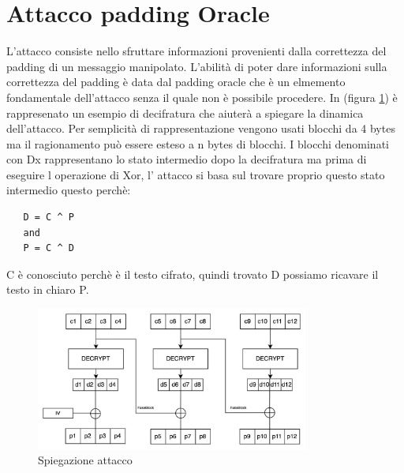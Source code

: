 \section{Attacco padding Oracle}

L'attacco consiste nello sfruttare informazioni provenienti dalla correttezza del padding di un messaggio manipolato.
L'abilità di poter dare informazioni sulla correttezza del padding è data dal padding oracle che è un elmemento 
fondamentale dell'attacco senza il quale non è possibile procedere.
In (figura \ref{fig:attack_1}) è rappresenato un esempio di decifratura che aiuterà a spiegare la dinamica dell'attacco.
Per semplicità di rappresentazione vengono usati blocchi da 4 bytes ma il ragionamento può essere esteso a n bytes di blocchi.
I blocchi denominati con Dx rappresentano lo stato intermedio dopo la decifratura ma prima di eseguire l operazione di Xor, 
l' attacco si basa sul trovare proprio questo stato intermedio questo perchè:

\begin{verbatim}
   D = C ^ P 
   and 
   P = C ^ D
\end{verbatim}
C è conosciuto perchè è il testo cifrato, quindi trovato D possiamo ricavare il testo in chiaro P.

\begin{figure}[h!]
    \includegraphics[width=0.8\textwidth]{img/attack.jpeg}
    \centering
    \caption{Spiegazione attacco}
    \label{fig:attack_1}
\end{figure}

